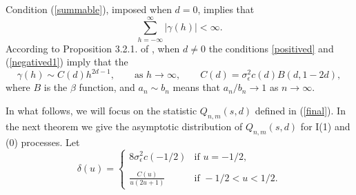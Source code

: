 \documentclass[12pt]{article}
\begin{document}
Condition (\ref{summable}), imposed when $d=0$, implies that 
 $$
 \sum_{h=-\infty}^\infty\vert\gamma(h)\vert<\infty.
 $$
 According to Proposition 3.2.1. of \cite{MR2977317}, when $d\neq 0$ the conditions \eqref{positived} and   (\ref{negatived1}) imply that the 
 \begin{equation}\label{gammad}
\gamma(h)\sim C(d) h^{2d-1},\qquad\textrm{as }h\to\infty,\qquad C(d)=\sigma^2_\epsilon c(d)B(d,1-2d),
 \end{equation}
 where $B$ is the $\beta$ function, and 
 $a_n\sim b_n$ means that $a_n/b_n\to1$ as $n\to\infty$.

In what  follows, we will focus on the statistic $Q_{n,m}(s,d)$ defined in (\ref{final}). In the next theorem  we give the  asymptotic
distribution of $Q_{n,m}(s,d)$ for I(1) and (0) processes. Let
\begin{equation}\label{const delta}
\delta(u)=\begin{cases}8\sigma^2_\epsilon c(-1/2)&\textrm{if }u=-1/2,\\\\
   \frac{C(u)}{u(2u+1)}&\textrm{if }-1/2<u<1/2.
\end{cases}
\end{equation}
\end{document}
